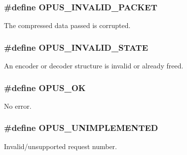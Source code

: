 \subsubsection[{\texorpdfstring{O\+P\+U\+S\+\_\+\+I\+N\+V\+A\+L\+I\+D\+\_\+\+P\+A\+C\+K\+ET}{OPUS_INVALID_PACKET}}]{\setlength{\rightskip}{0pt plus 5cm}\#define O\+P\+U\+S\+\_\+\+I\+N\+V\+A\+L\+I\+D\+\_\+\+P\+A\+C\+K\+ET}\hypertarget{group__opus__errorcodes_ga46fc9dd493fb8e291bd8e838f0988bb7}{}\label{group__opus__errorcodes_ga46fc9dd493fb8e291bd8e838f0988bb7}


The compressed data passed is corrupted. 

\subsubsection[{\texorpdfstring{O\+P\+U\+S\+\_\+\+I\+N\+V\+A\+L\+I\+D\+\_\+\+S\+T\+A\+TE}{OPUS_INVALID_STATE}}]{\setlength{\rightskip}{0pt plus 5cm}\#define O\+P\+U\+S\+\_\+\+I\+N\+V\+A\+L\+I\+D\+\_\+\+S\+T\+A\+TE}\hypertarget{group__opus__errorcodes_ga54416ec79619179d688918f25e9b20e3}{}\label{group__opus__errorcodes_ga54416ec79619179d688918f25e9b20e3}


An encoder or decoder structure is invalid or already freed. 

\subsubsection[{\texorpdfstring{O\+P\+U\+S\+\_\+\+OK}{OPUS_OK}}]{\setlength{\rightskip}{0pt plus 5cm}\#define O\+P\+U\+S\+\_\+\+OK}\hypertarget{group__opus__errorcodes_gaa44cf8a185e1b5cb940ef63eb4f02d21}{}\label{group__opus__errorcodes_gaa44cf8a185e1b5cb940ef63eb4f02d21}


No error. 

\subsubsection[{\texorpdfstring{O\+P\+U\+S\+\_\+\+U\+N\+I\+M\+P\+L\+E\+M\+E\+N\+T\+ED}{OPUS_UNIMPLEMENTED}}]{\setlength{\rightskip}{0pt plus 5cm}\#define O\+P\+U\+S\+\_\+\+U\+N\+I\+M\+P\+L\+E\+M\+E\+N\+T\+ED}\hypertarget{group__opus__errorcodes_ga3b8d73b0f44b8b925ff40fd7c02b14a0}{}\label{group__opus__errorcodes_ga3b8d73b0f44b8b925ff40fd7c02b14a0}


Invalid/unsupported request number. 


